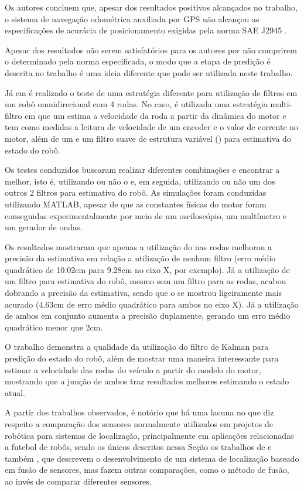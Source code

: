 \documentclass[acronym, symbols, table]{fei}
\begin{document}
Os autores concluem que, apesar dos resultados positivos alcançados no trabalho, o sistema de navegação odométrica auxiliada por GPS não alcançou as especificações de acurácia de posicionamento exigidas pela norma SAE J2945 \cite{sae2016board}.

Apesar dos resultados não serem satisfatórios para os autores por não cumprirem o determinado pela norma especificada, o modo que a etapa de predição é descrita no trabalho é uma ideia diferente que pode ser utilizada neste trabalho.

Já em \textcite{9233826} é realizado o teste de uma estratégia diferente para utilização de filtros em um robô omnidirecional com 4 rodas. No caso, é utilizada uma estratégia multi-filtro em que um  estima a velocidade da roda a partir da dinâmica do motor e tem como medidas a leitura de velocidade de um encoder e o valor de corrente no motor, além de um  e um filtro suave de estrutura variável () para estimativa do estado do robô.

Os testes conduzidos buscaram realizar diferentes combinações e encontrar a melhor, isto é, utilizando ou não o  e, em seguida, utilizando ou não um dos outros 2 filtros para estimativa do robô. As simulações foram conduzidas utilizando MATLAB, apesar de que as constantes físicas do motor foram conseguidas experimentalmente por meio de um osciloscópio, um multímetro e um gerador de ondas.

Os resultados mostraram que apenas a utilização do  nas rodas melhorou a precisão da estimativa em relação a utilização de nenhum filtro (erro médio quadrático de 10.02cm para 9.28cm no eixo X, por exemplo). Já a utilização de um filtro para estimativa do robô, mesmo sem um filtro para as rodas, acabou dobrando a precisão da estimativa, sendo que o  se mostrou ligeiramente mais acurado (4.63cm de erro médio quadrático para ambos no eixo X). Já a utilização de ambos em conjunto aumenta a precisão duplamente, gerando um erro médio quadrático menor que 2cm.

O trabalho demonstra a qualidade da utilização do filtro de Kalman para predição do estado do robô, além de mostrar uma maneira interessante para estimar a velocidade das rodas do veículo a partir do modelo do motor, mostrando que a junção de ambos traz resultados melhores estimando o estado atual.

A partir dos trabalhos observados, é notório que há uma lacuna no que diz respeito a comparação dos sensores normalmente utilizados em projetos de robótica para sistemas de localização, principalmente em aplicações relacionadas a futebol de robôs, sendo os únicos descritos nessa Seção os trabalhos de \textcite{aguiar2017kalman} e também \cite{ismail2022soccer}, que descrevem o desenvolvimento de um sistema de localização baseado em fusão de sensores, mas fazem outras comparações, como o método de fusão, ao invés de comparar diferentes sensores.
\end{document}
